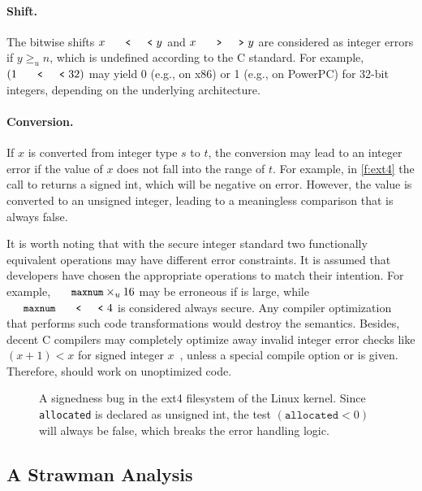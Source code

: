 \paragraph{Shift.}
The bitwise shifts $x \shl y$ and $x \shr y$ are considered as
integer errors if $y \geq_u n$, which is undefined according to the
C standard.  For example, $(1 \shl 32)$ may yield 0 (e.g., on x86)
or 1 (e.g., on PowerPC) for 32-bit integers, depending on the
underlying architecture.

\paragraph{Conversion.}
If $x$ is converted from integer type $s$ to $t$, the conversion
may lead to an integer error if the value of $x$ does not fall into
the range of $t$.  For example, in \autoref{f:ext4} the call to
 returns a signed int, which will be negative
on error.  However, the value is converted to an unsigned integer,
leading to a meaningless comparison that is always false.

\paraend

It is worth noting that with the secure integer standard two
functionally equivalent operations may have different error constraints.
It is assumed that developers have chosen the appropriate operations
to match their intention.  For example, $\cc{maxnum}\times_u 16$
may be erroneous if  is large, while $\cc{maxnum} \shl
4$ is considered always secure.  Any compiler optimization that
performs such code transformations would destroy the semantics.
Besides, decent C compilers may completely optimize away invalid
integer error checks like $(x + 1) < x$ for signed integer
$x$~\cite{gcc:signed-overflow,us-cert:gcc}, unless a special compile
option  or  is given.  Therefore,
\sys should work on unoptimized code.

\begin{figure}
\centering

\caption{A signedness bug in the ext4 filesystem of the Linux kernel.
Since \texttt{allocated} is declared as unsigned int, the test
$(\texttt{allocated} < 0)$ will always be false, which breaks the
error handling logic.}
\label{f:ext4}
\end{figure}

\subsection{A Strawman Analysis}

